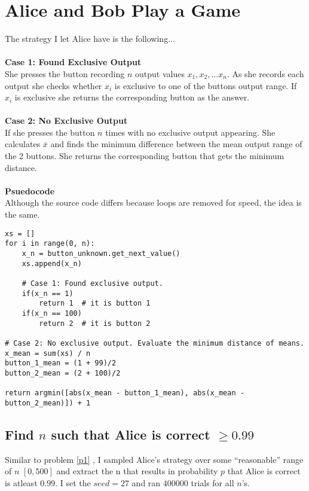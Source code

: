 \documentclass[twocolumn]{article}
\begin{document}
\section{Alice and Bob Play a Game}
The strategy I let Alice have is the following...
\\\\
\noindent
\textbf{Case 1: Found Exclusive Output}\\
She presses the button recording $n$ output values $x_1, x_2, ... x_n$.
As she records each output she checks whether $x_i$ is exclusive to one of the buttons output range. If $x_i$ is exclusive she returns the corresponding button as the answer.
\\\\
\textbf{Case 2: No Exclusive Output}\\
If she presses the button $n$ times with no exclusive output appearing. She calculates $\bar{x}$ and finds the minimum difference between the mean output range of the 2 buttons. She returns the corresponding button that gets the minimum distance.
\\\\
\textbf{Psuedocode}\\
Although the source code differs because loops are removed for speed, the idea is the same.
\begin{lstlisting}
xs = []
for i in range(0, n):	
	x_n = button_unknown.get_next_value()
	xs.append(x_n) 	
	
	# Case 1: Found exclusive output.
	if(x_n == 1)
		return 1  # it is button 1
	if(x_n == 100)
		return 2  # it is button 2
		
# Case 2: No exclusive output. Evaluate the minimum distance of means.
x_mean = sum(xs) / n
button_1_mean = (1 + 99)/2
button_2_mean = (2 + 100)/2

return argmin([abs(x_mean - button_1_mean), abs(x_mean - button_2_mean)]) + 1
\end{lstlisting}

\subsection*{Find $n$ such that Alice is correct $\ge 0.99$}
Similar to problem \ref{p1} , I sampled Alice's strategy over some ``reasonable'' range of $n$ $[0, 500]$ and extract the n that results in probability $p$ that Alice is correct is atleast $0.99$. I set the $seed=27$ and  ran $400000$ trials for all $n$'s.
\end{document}
